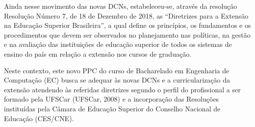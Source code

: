 Ainda nesse movimento das novas DCNs, estabeleceu-se, através da resolução Resolução Número 7, de 18 de Dezembro de 2018, as “Diretrizes para a Extensão na Educação Superior Brasileira”, a qual define os princípios, os fundamentos e os procedimentos que devem ser observados no planejamento nas políticas, na gestão e na avaliação das  instituições de educação superior de todos os sistemas de ensino do país em relação a extensão nos cursos de graduação.

Neste contexto, este novo PPC do curso de Bacharelado em Engenharia de Computação (EC) busca se adequar às novas DCNs e a curricularização da extensão atendendo às referidas diretrizes segundo o perfil do profissional a ser formado pela UFSCar (UFSCar, 2008) e a incorporação das Resoluções instituídas pela Câmara de Educação Superior do Conselho Nacional de Educação (CES/CNE).  %

